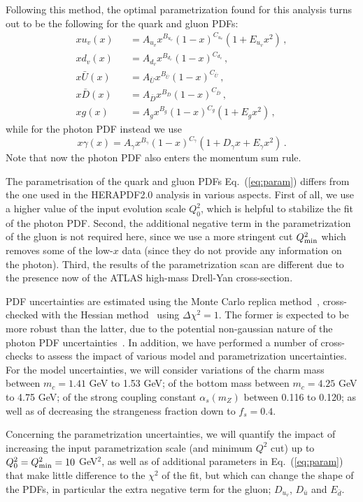 Following this method, the optimal parametrization found for this analysis turns
out to be the following for the quark and gluon PDFs:
\begin{eqnarray}
  \nonumber
  xu_v(x) &&= A_{u_v}x^{B_{u_v}}(1-x)^{C_{u_v}}(1+E_{u_v}x^{2})\, , \\
  \nonumber
xd_v(x) &&= A_{d_v}x^{B_{d_v}}(1-x)^{C_{d_v}}\, , \\
x\bar{U}(x) &&= A_{\bar{U}}x^{B_{\bar{U}}}(1-x)^{C_{\bar{U}}}\, , \\
\nonumber
x\bar{D}(x) &&= A_{\bar{D}}x^{B_{\bar{D}}}(1-x)^{C_{\bar{D}}}\, , \\
\nonumber
\label{eq:param}
xg(x) &&= A_{g}x^{B_{g}}(1-x)^{C_{g}}(1+E_{g}x^{2})\, ,
\end{eqnarray}
while for the photon PDF instead we use
\begin{equation}
x\gamma(x) = A_{\gamma}x^{B_{\gamma}}(1-x)^{C_{\gamma}}(1+D_{\gamma}x+E_{\gamma}x^{2}) \, .
\end{equation}
Note that now the photon PDF also enters the momentum sum rule.

The parametrisation of the quark and gluon PDFs Eq.~(\ref{eq:param}) differs from the one used
in the HERAPDF2.0 analysis in various aspects.
%
First of all, we use a higher value of the input evolution scale $Q^2_0$, which is helpful
to stabilize the fit of the photon PDF.
%
Second, the additional negative term in the parametrization of the gluon
is not required here, since we use a more stringent cut $Q_{\rm min}^2$ which removes
some of the low-$x$ data (since they do not provide any information on the photon).
%
Third, the results of the parametrization scan are different due to the presence now
of the ATLAS high-mass Drell-Yan cross-section.

PDF uncertainties are estimated using the Monte Carlo
replica method~\cite{DelDebbio:2004xtd,DelDebbio:2007ee}, cross-checked
with the Hessian method~\cite{Pumplin:2001ct} using $\Delta\chi^2=1$.
%
The former is expected to be more robust than the latter, due to the potential
non-gaussian nature of the photon PDF uncertainties~\cite{Ball:2013hta}.
%
In addition, we have performed a number of cross-checks to assess the impact
of various model and parametrization uncertainties.
%
For the model uncertainties, we will consider variations of the charm mass
between $m_c=1.41$ GeV to 1.53 GeV; of the bottom mass between
$m_c=4.25$ GeV to 4.75 GeV; of the strong
coupling constant $\alpha_s(m_Z)$ between 0.116 to 0.120; as well
as of decreasing the strangeness fraction down to  $f_s=0.4$.


Concerning the parametrization uncertainties, we will quantify the impact of
 increasing the input parametrization scale
 (and minimum $Q^2$ cut) up to $Q_0^2=Q^2_{\rm min}=10$ GeV$^2$, as well as
 of additional parameters in Eq.~(\ref{eq:param}) that make little difference to the $\chi^2$ of the fit, but which can change the shape of the PDFs, in particular the extra negative term for the gluon; $D_{u_v}$, $D_{\bar{u}}$ and $E_{\bar{d}}$.
